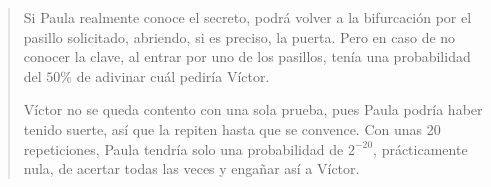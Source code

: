 \begin{quote}
Si Paula realmente conoce el secreto, podrá volver a la bifurcación por el pasillo solicitado, abriendo, si es preciso, la puerta.
Pero en caso de no conocer la clave, al entrar por uno de los pasillos, tenía una probabilidad del $50\%$ de adivinar cuál pediría Víctor.



Víctor no se queda contento con una sola prueba, pues Paula podría haber tenido suerte, así que la repiten hasta que se convence. Con unas 20 repeticiones, Paula tendría solo una probabilidad de $2^{-20}$, prácticamente nula, de acertar todas las veces y engañar así a Víctor.



\end{quote}
